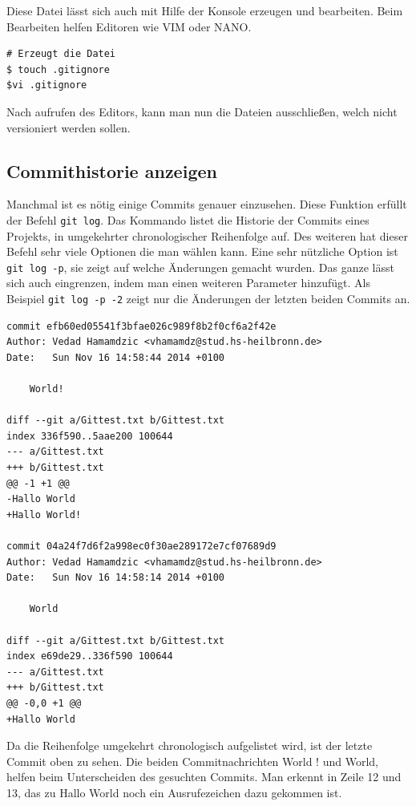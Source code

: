 \documentclass[12pt,a4paper,bibliography=totocnumbered,listof=totocnumbered]{scrartcl}
\begin{document}
Diese Datei lässt sich auch mit Hilfe der Konsole erzeugen und bearbeiten. Beim Bearbeiten helfen Editoren wie VIM oder NANO. 
\vspace{1em}
\begin{lstlisting}[caption=Git Erstellen der.gitignore Datei, label=lst:arduino]
# Erzeugt die Datei 
$ touch .gitignore
$vi .gitignore
\end{lstlisting}

Nach aufrufen des Editors, kann man nun die Dateien ausschließen, welch nicht versioniert werden sollen.
 

\subsection{Commithistorie anzeigen}
Manchmal ist es nötig einige Commits genauer einzusehen. Diese Funktion erfüllt der Befehl  \lstinline|git log|. Das Kommando listet die Historie der Commits eines Projekts, in umgekehrter chronologischer Reihenfolge auf. Des weiteren hat dieser Befehl sehr viele Optionen die man wählen kann. Eine sehr nützliche Option ist \lstinline|git log -p|, sie zeigt auf welche Änderungen gemacht wurden. Das ganze lässt sich auch eingrenzen, indem man einen weiteren Parameter hinzufügt. Als Beispiel \lstinline|git log -p -2| zeigt nur die Änderungen der letzten beiden Commits an.

\vspace{1em}
\begin{lstlisting}[caption=Git log Unterschiede der letzten 2 Commits, label=lst:arduino]
commit efb60ed05541f3bfae026c989f8b2f0cf6a2f42e
Author: Vedad Hamamdzic <vhamamdz@stud.hs-heilbronn.de>
Date:   Sun Nov 16 14:58:44 2014 +0100

    World!

diff --git a/Gittest.txt b/Gittest.txt
index 336f590..5aae200 100644
--- a/Gittest.txt
+++ b/Gittest.txt
@@ -1 +1 @@
-Hallo World
+Hallo World!

commit 04a24f7d6f2a998ec0f30ae289172e7cf07689d9
Author: Vedad Hamamdzic <vhamamdz@stud.hs-heilbronn.de>
Date:   Sun Nov 16 14:58:14 2014 +0100

    World

diff --git a/Gittest.txt b/Gittest.txt
index e69de29..336f590 100644
--- a/Gittest.txt
+++ b/Gittest.txt
@@ -0,0 +1 @@
+Hallo World
\end{lstlisting}
Da die Reihenfolge umgekehrt chronologisch aufgelistet wird, ist der letzte Commit oben zu sehen. Die beiden Commitnachrichten World ! und World, helfen beim Unterscheiden des gesuchten Commits. Man erkennt in Zeile 12 und 13, das zu Hallo World noch ein Ausrufezeichen dazu gekommen ist.
\newpage
\end{document}
